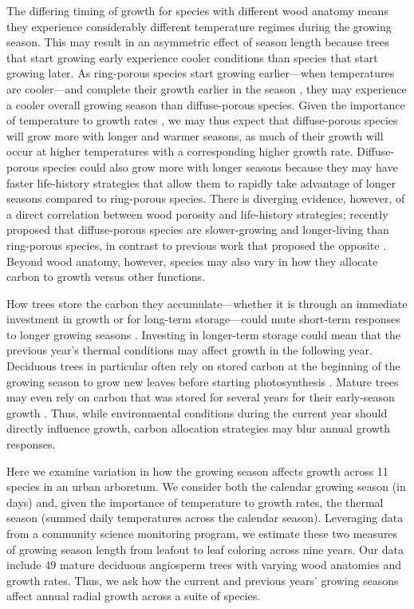 The differing timing of growth for species with different wood anatomy means they experience considerably different temperature regimes during the growing season. This may result in an asymmetric effect of season length because trees that start growing early experience cooler conditions than species that start growing later. As ring-porous species start growing earlier---when temperatures are cooler---and complete their growth earlier in the season \citep{michelot_comparing_2012,dorangeville_peak_2022}, they may experience a cooler overall growing season than diffuse-porous species. Given the importance of temperature to growth rates \citep{chuine_processbased_2017,wang_simulation_1998}, we may thus expect that diffuse-porous species will grow more with longer and warmer seasons, as much of their growth will occur at higher temperatures with a corresponding higher growth rate. Diffuse-porous species could also grow more with longer seasons because they may have faster life-history strategies that allow them to rapidly take advantage of longer seasons compared to ring-porous species. There is diverging evidence, however, of a direct correlation between wood porosity and life-history strategies; \cite{lv_xylem_2025} recently proposed that diffuse-porous species are slower-growing and longer-living than ring-porous species, in contrast to previous work that proposed the opposite \citep{taneda_casestudy_2008}. Beyond wood anatomy, however, species may also vary in how they allocate carbon to growth versus other functions.

How trees store the carbon they accumulate---whether it is through an immediate investment in growth or for long-term storage---could mute short-term responses to longer growing seasons \citep{hesslCarbonUptakeStorage2026}. Investing in longer-term storage could mean that the previous year's thermal conditions may affect growth in the following year. Deciduous trees in particular often rely on stored carbon at the beginning of the growing season to grow new leaves before starting photosynthesis \citep{zweifel_intraannual_2006,monson_finding_2018,wolkovich_why_2025}. Mature trees may even rely on carbon that was stored for several years for their early-season growth \citep{hesslCarbonUptakeStorage2026}. Thus, while environmental conditions during the current year should directly influence growth, carbon allocation strategies may blur annual growth responses. 

Here we examine variation in how the growing season affects growth across 11 species in an urban arboretum. We consider both the calendar growing season (in days) and, given the importance of temperature to growth rates, the thermal season (summed daily temperatures across the calendar season). Leveraging data from a community science monitoring program, we estimate these two measures of growing season length from leafout to leaf coloring across nine years. Our data include 49 mature deciduous angiosperm trees with varying wood anatomies and growth rates. Thus, we ask how the current and previous years' growing seasons affect annual radial growth across a suite of species.

